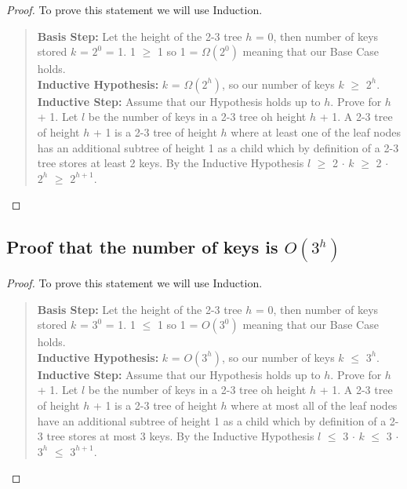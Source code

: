 \documentclass{article}
\begin{document}
\begin{proof} To prove this statement we will use Induction.
\begin{quote}
\textbf{Basis Step:}
Let the height of the 2-3 tree $h$ = 0, then number of keys stored $k$ = $2^{0}$ = 1. 1 $\geq$ 1
so 1 = $\Omega{(2^0)}$ meaning that our Base Case holds. \\

\textbf{Inductive Hypothesis:}
$k$ = $\Omega{(2^h)}$, so our number of keys $k$ $\geq$ $2^h$. \\

\textbf{Inductive Step:}
Assume that our Hypothesis holds up to $h$. Prove for $h$ + 1. Let $l$ be the number
of keys in a 2-3 tree oh height $h$ + 1. A 2-3 tree of height
$h$ + 1 is a 2-3 tree of height $h$ where at least one of the leaf nodes has an additional 
subtree of height 1 as a child which by definition of a 2-3 tree stores at least 2 keys. By the Inductive
Hypothesis $l$ $\geq$ 2 $\cdot$ $k$ $\geq$ 2 $\cdot$ $2^h$ $\geq$ $2^{h+1}$.

\end{quote}
\end{proof}

\subsection*{Proof that the number of keys is $O{(3^h)}$}

\begin{proof} To prove this statement we will use Induction.
\begin{quote}
\textbf{Basis Step:}
Let the height of the 2-3 tree $h$ = 0, then number of keys stored $k$ = $3^{0}$ = 1. 1 $\leq$ 1
so 1 = $O{(3^0)}$ meaning that our Base Case holds. \\

\textbf{Inductive Hypothesis:}
$k$ = $O{(3^h)}$, so our number of keys $k$ $\leq$ $3^h$. \\

\textbf{Inductive Step:}
Assume that our Hypothesis holds up to $h$. Prove for $h$ + 1. Let $l$ be the number
of keys in a 2-3 tree oh height $h$ + 1. A 2-3 tree of height
$h$ + 1 is a 2-3 tree of height $h$ where at most all of the leaf nodes have an additional 
subtree of height 1 as a child which by definition of a 2-3 tree stores at most 3 keys. By the Inductive
Hypothesis $l$ $\leq$ 3 $\cdot$ $k$ $\leq$ 3 $\cdot$ $3^h$ $\leq$ $3^{h+1}$.

\end{quote}
\end{proof}
\end{document}

